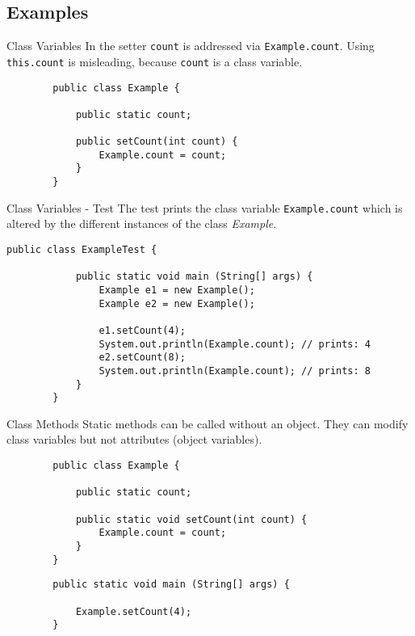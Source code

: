 \subsection{Examples}
\begin{frame}[fragile]{Class Variables}
	In the setter \texttt{count} is addressed via \texttt{Example.count}.
	Using \texttt{this.count} is misleading, because \texttt{count} is a class variable.	
	\begin{lstlisting}
		public class Example {
			
			public static count;
			
			public setCount(int count) {
				Example.count = count;
			}
		}
	\end{lstlisting}
\end{frame}

\begin{frame}[fragile]{Class Variables - Test}
	The test prints the class variable \texttt{Example.count} which is altered
	by the different instances of the class \emph{Example}.	
	\begin{lstlisting}[basicstyle=\ttfamily\scriptsize]
		public class ExampleTest {
			
			public static void main (String[] args) {
				Example e1 = new Example();
				Example e2 = new Example();
				
				e1.setCount(4);
				System.out.println(Example.count); // prints: 4
				e2.setCount(8);
				System.out.println(Example.count); // prints: 8
			}
		}
	\end{lstlisting}
\end{frame}

\begin{frame}[fragile]{Class Methods}
	Static methods can be called without an object.
	They can modify class variables but not attributes (object variables).
	\begin{lstlisting}
		public class Example {
			
			public static count;
			
			public static void setCount(int count) {
				Example.count = count;
			}
		}
	\end{lstlisting}
	\begin{lstlisting}
		public static void main (String[] args) {
			
			Example.setCount(4);
		}
	\end{lstlisting}
\end{frame}

